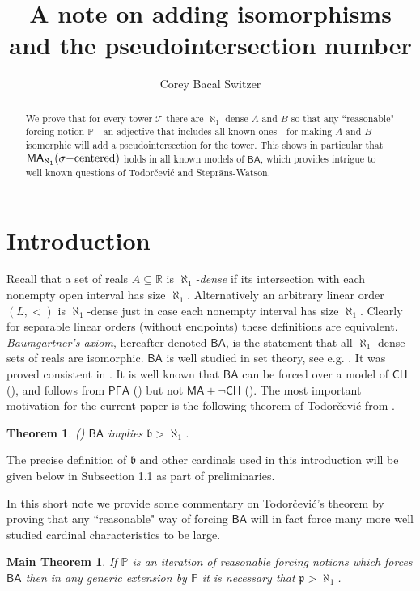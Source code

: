 \documentclass[leqno,11pt]{amsart}
\title{A note on adding isomorphisms and the pseudointersection number}
\author[Switzer]{Corey Bacal Switzer}
\newtheorem{theorem}{Theorem}[section]
\newtheorem{maintheorem}{Main Theorem}[section]
\theoremstyle{definition}
\theoremstyle{remark}
\def\Null{\mathcal N}
\def\PFA{\mathsf{PFA}}
\def\MA{\mathsf{MA}}
\def\BA{\mathsf{BA}}
\def\mfb{\mathfrak b}
\def\CH {\mathsf{CH}}
\def\P{\mathbb P}
\def\mfp{\mathfrak{p}}
\begin{document}
\begin{abstract}
   We prove that for every tower $\mathcal T$ there are $\aleph_1$-dense $A$ and $B$ so that any ``reasonable" forcing notion $\P$ - an adjective that includes all known ones - for making $A$ and $B$ isomorphic will add a pseudointersection for the tower. This shows in particular that $\MA_{\aleph_1}(\sigma{\rm -centered})$ holds in all known models of $\BA$, which provides intrigue to well known questions of Todor\v{c}evi\'c and Stepr\=ans-Watson. 
\end{abstract}

\maketitle

\section{Introduction}

Recall that a set of reals $A\subseteq \mathbb R$ is $\aleph_1${\em -dense} if its intersection with each nonempty open interval has size $\aleph_1$. Alternatively an arbitrary linear order $(L, <)$ is $\aleph_1$-dense just in case each nonempty interval has size $\aleph_1$. Clearly for separable linear orders (without endpoints) these definitions are equivalent. {\em Baumgartner's axiom}, hereafter denoted $\BA$, is the statement that all $\aleph_1$-dense sets of reals are isomorphic. $\BA$ is well studied in set theory, see e.g. \cite{Baum73, weakBA, BaumPFA, ARS85, AvrahamShelah81}. It was proved consistent in \cite{Baum73}. It is well known that $\BA$ can be forced over a model of $\CH$ (\cite{Baum73}), and follows from $\PFA$ (\cite{BaumPFA}) but not $\MA + \neg \CH$ (\cite{AvrahamShelah81}). The most important motivation for the current paper is the following theorem of Todor\v{c}evi\'{c} from \cite{Todorcevic89}. 

\begin{theorem}(\cite{Todorcevic89}) \label{todorcevic}
$\BA$ implies $\mfb > \aleph_1$. 
\end{theorem}

The precise definition of $\mfb$ and other cardinals used in this introduction will be given below in Subsection 1.1 as part of preliminaries.

In this short note we provide some commentary on Todor\v{c}evi\'c's theorem by proving that any ``reasonable" way of forcing $\BA$ will in fact force many more well studied cardinal characteristics to be large.
\begin{maintheorem} \label{introtheorem}
    If $\P$ is an iteration of {\em reasonable} forcing notions which forces $\BA$ then in any generic extension by $\P$ it is necessary that $\mfp > \aleph_1$. %
\end{maintheorem}
\end{document}

